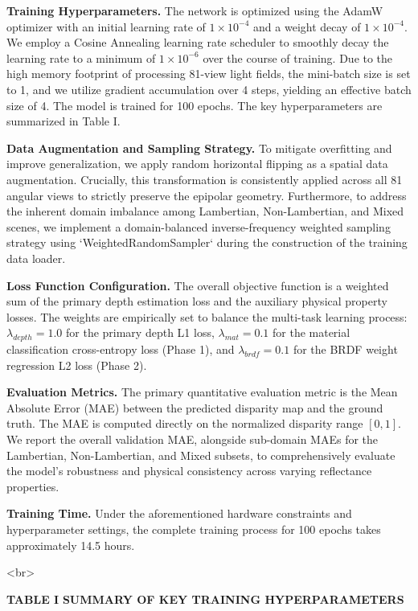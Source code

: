 \textbf{Training Hyperparameters.} 
The network is optimized using the AdamW optimizer with an initial learning rate of $1 \times 10^{-4}$ and a weight decay of $1 \times 10^{-4}$. We employ a Cosine Annealing learning rate scheduler to smoothly decay the learning rate to a minimum of $1 \times 10^{-6}$ over the course of training. Due to the high memory footprint of processing 81-view light fields, the mini-batch size is set to 1, and we utilize gradient accumulation over 4 steps, yielding an effective batch size of 4. The model is trained for 100 epochs. The key hyperparameters are summarized in Table I.

\textbf{Data Augmentation and Sampling Strategy.} 
To mitigate overfitting and improve generalization, we apply random horizontal flipping as a spatial data augmentation. Crucially, this transformation is consistently applied across all 81 angular views to strictly preserve the epipolar geometry. Furthermore, to address the inherent domain imbalance among Lambertian, Non-Lambertian, and Mixed scenes, we implement a domain-balanced inverse-frequency weighted sampling strategy using `WeightedRandomSampler` during the construction of the training data loader.

\textbf{Loss Function Configuration.} 
The overall objective function is a weighted sum of the primary depth estimation loss and the auxiliary physical property losses. The weights are empirically set to balance the multi-task learning process: $\lambda_{depth} = 1.0$ for the primary depth L1 loss, $\lambda_{mat} = 0.1$ for the material classification cross-entropy loss (Phase 1), and $\lambda_{brdf} = 0.1$ for the BRDF weight regression L2 loss (Phase 2). 

\textbf{Evaluation Metrics.} 
The primary quantitative evaluation metric is the Mean Absolute Error (MAE) between the predicted disparity map and the ground truth. The MAE is computed directly on the normalized disparity range $[0, 1]$. We report the overall validation MAE, alongside sub-domain MAEs for the Lambertian, Non-Lambertian, and Mixed subsets, to comprehensively evaluate the model's robustness and physical consistency across varying reflectance properties.

\textbf{Training Time.} 
Under the aforementioned hardware constraints and hyperparameter settings, the complete training process for 100 epochs takes approximately 14.5 hours.

<br>

\textbf{TABLE I}
\textbf{SUMMARY OF KEY TRAINING HYPERPARAMETERS}

